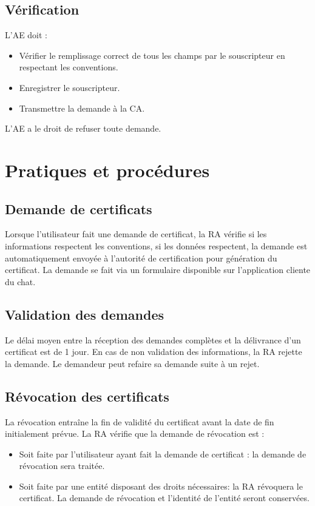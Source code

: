 \documentclass[a4paper,11pt,french]{book}
\begin{document}
\subsection{Vérification}
L’AE doit :
\begin{itemize}
\item Vérifier le remplissage correct de tous les champs par le souscripteur en respectant les conventions.
\item Enregistrer le souscripteur.
\item Transmettre la demande à la CA.
\end{itemize}
L’AE a le droit de refuser toute demande.

\section{Pratiques et procédures}
\subsection{Demande de certificats}
Lorsque l'utilisateur fait une demande de certificat, la RA vérifie si les informations respectent les conventions, si les données
respectent, la demande est automatiquement envoyée à l'autorité de certification pour génération du certificat. La demande se fait via un formulaire disponible sur l'application cliente du chat.

\subsection{Validation  des demandes}
Le délai moyen entre la réception des demandes complètes et la délivrance d'un certificat est de 1 jour. En cas de non validation des informations, la RA rejette la demande. Le demandeur peut refaire sa demande suite à un rejet.

\subsection{Révocation des certificats}
La révocation entraîne la fin de validité du certificat avant la date de fin initialement prévue. La RA vérifie que la demande de révocation est :
\begin{itemize}
\item Soit faite par l'utilisateur ayant fait la demande de certificat :  la demande de révocation sera traitée.
\item Soit faite par une entité disposant des droits nécessaires: la RA révoquera le certificat. La demande de révocation et l'identité de l'entité seront conservées.
\end{itemize}
\end{document}
